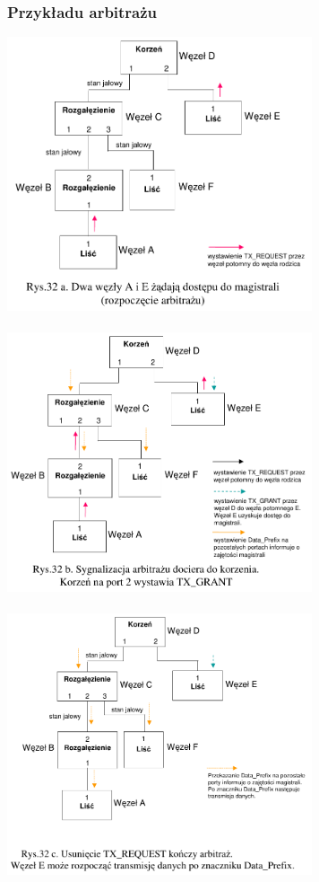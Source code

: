 \subsubsection{Przykładu arbitrażu}
\includegraphics[width=9cm]{./wyklady/FIREWIRE_36_1.pdf}\\\\
\includegraphics[width=9cm]{./wyklady/FIREWIRE_37_1.pdf}\\\\
\includegraphics[width=9cm]{./wyklady/FIREWIRE_38_1.pdf}\\\\
